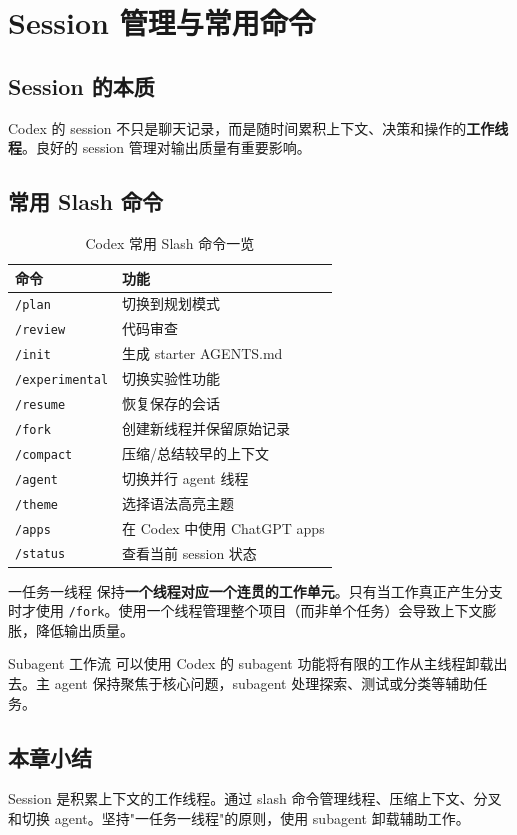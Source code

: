 \section{Session 管理与常用命令}

\subsection{Session 的本质}

Codex 的 session 不只是聊天记录，而是随时间累积上下文、决策和操作的\textbf{工作线程}。良好的 session 管理对输出质量有重要影响。

\subsection{常用 Slash 命令}

\begin{table}[H]
\centering
\begin{tabular}{ll}
\toprule
\textbf{命令} & \textbf{功能} \\
\midrule
\texttt{/plan} & 切换到规划模式 \\
\texttt{/review} & 代码审查 \\
\texttt{/init} & 生成 starter AGENTS.md \\
\texttt{/experimental} & 切换实验性功能 \\
\texttt{/resume} & 恢复保存的会话 \\
\texttt{/fork} & 创建新线程并保留原始记录 \\
\texttt{/compact} & 压缩/总结较早的上下文 \\
\texttt{/agent} & 切换并行 agent 线程 \\
\texttt{/theme} & 选择语法高亮主题 \\
\texttt{/apps} & 在 Codex 中使用 ChatGPT apps \\
\texttt{/status} & 查看当前 session 状态 \\
\bottomrule
\end{tabular}
\caption{Codex 常用 Slash 命令一览}
\end{table}

\begin{importantbox}{一任务一线程}
保持\textbf{一个线程对应一个连贯的工作单元}。只有当工作真正产生分支时才使用 \texttt{/fork}。使用一个线程管理整个项目（而非单个任务）会导致上下文膨胀，降低输出质量。
\end{importantbox}

\begin{knowledgebox}{Subagent 工作流}
可以使用 Codex 的 subagent 功能将有限的工作从主线程卸载出去。主 agent 保持聚焦于核心问题，subagent 处理探索、测试或分类等辅助任务。
\end{knowledgebox}

\subsection{本章小结}

Session 是积累上下文的工作线程。通过 slash 命令管理线程、压缩上下文、分叉和切换 agent。坚持"一任务一线程"的原则，使用 subagent 卸载辅助工作。

